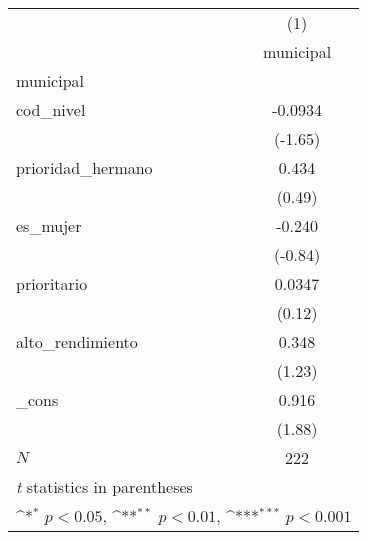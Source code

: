 {
\def\sym#1{\ifmmode^{#1}\else\(^{#1}\)\fi}
\begin{tabular}{l*{1}{c}}
\hline\hline
            &\multicolumn{1}{c}{(1)}\\
            &\multicolumn{1}{c}{municipal}\\
\hline
municipal   &                     \\
cod\_nivel   &     -0.0934         \\
            &     (-1.65)         \\
[1em]
prioridad\_hermano&       0.434         \\
            &      (0.49)         \\
[1em]
es\_mujer    &      -0.240         \\
            &     (-0.84)         \\
[1em]
prioritario &      0.0347         \\
            &      (0.12)         \\
[1em]
alto\_rendimiento&       0.348         \\
            &      (1.23)         \\
[1em]
\_cons      &       0.916         \\
            &      (1.88)         \\
\hline
\(N\)       &         222         \\
\hline\hline
\multicolumn{2}{l}{\footnotesize \textit{t} statistics in parentheses}\\
\multicolumn{2}{l}{\footnotesize \sym{*} \(p<0.05\), \sym{**} \(p<0.01\), \sym{***} \(p<0.001\)}\\
\end{tabular}
}
